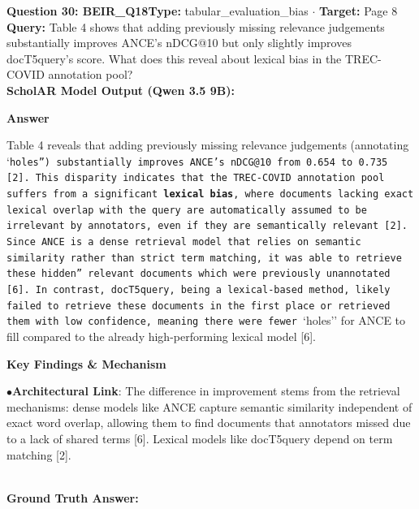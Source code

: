\documentclass[10pt,a4paper]{article}
\begin{document}
\begin{tcolorbox}[questionbox]
{\noindent\bfseries\large\color{navy} Question 30: BEIR\_Q18}\hfill {\footnotesize\color{darkteal}\textbf{Type:} tabular\_evaluation\_bias $\cdot$ \textbf{Target:} Page 8}\\[4pt]
{\noindent\bfseries\color{accentblue} Query: } Table 4 shows that adding previously missing relevance judgements substantially improves ANCE's nDCG@10 but only slightly improves docT5query's score. What does this reveal about lexical bias in the TREC-COVID annotation pool?\\[6pt]
{\noindent\bfseries\color{navy} ScholAR Model Output (Qwen 3.5 9B):}\\[2pt]
{\small \noindent \textbf{Answer}\par\vspace{3pt}Table 4  reveals that adding previously missing relevance judgements (annotating `\texttt{holes'') substantially improves ANCE's nDCG@10 from 0.654 to 0.735 [2]. This disparity indicates that the TREC-COVID annotation pool suffers from a significant \textbf{lexical bias}, where documents lacking exact lexical overlap with the query are automatically assumed to be irrelevant by annotators, even if they are semantically relevant [2]. Since ANCE is a dense retrieval model that relies on semantic similarity rather than strict term matching, it was able to retrieve these }\texttt{hidden'' relevant documents which were previously unannotated [6]. In contrast, docT5query, being a lexical-based method, likely failed to retrieve these documents in the first place or retrieved them with low confidence, meaning there were fewer }`holes'' for ANCE to fill compared to the already high-performing lexical model [6].\par\vspace{3pt}\noindent \textbf{Key Findings \& Mechanism}\par\vspace{3pt}\noindent\hspace*{8pt}$\bullet$\hspace*{4pt}\textbf{Architectural Link}: The difference in improvement stems from the retrieval mechanisms: dense models like ANCE capture semantic similarity independent of exact word overlap, allowing them to find documents that annotators missed due to a lack of shared terms [6]. Lexical models like docT5query depend on term matching [2].}\\[6pt]
{\noindent\bfseries\color{darkteal} Ground Truth Answer:}\\[2pt]

\end{tcolorbox}
\end{document}

